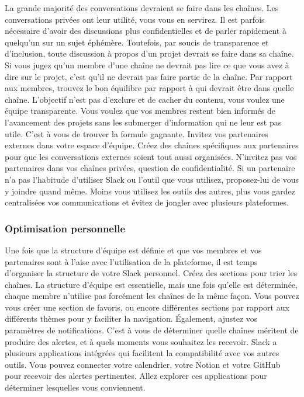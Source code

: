 \documentclass[
  letterpaper,
  DIV=11,
  numbers=noendperiod]{scrreprt}
\begin{document}
La grande majorité des conversations devraient se faire dans les
chaînes. Les conversations privées ont leur utilité, vous vous en
servirez. Il est parfois nécessaire d'avoir des discussions plus
confidentielles et de parler rapidement à quelqu'un sur un sujet
éphémère. Toutefois, par soucis de transparence et d'inclusion, toute
discussion à propos d'un projet devrait se faire dans sa chaîne. Si vous
jugez qu'un membre d'une chaîne ne devrait pas lire ce que vous avez à
dire sur le projet, c'est qu'il ne devrait pas faire partie de la
chaîne. Par rapport aux membres, trouvez le bon équilibre par rapport à
qui devrait être dans quelle chaîne. L'objectif n'est pas d'exclure et
de cacher du contenu, vous voulez une équipe transparente. Vous voulez
que vos membres restent bien informés de l'avancement des projets sans
les submerger d'information qui ne leur est pas utile. C'est à vous de
trouver la formule gagnante. Invitez vos partenaires externes dans votre
espace d'équipe. Créez des chaînes spécifiques aux partenaires pour que
les conversations externes soient tout aussi organisées. N'invitez pas
vos partenaires dans vos chaînes privées, question de confidentialité.
Si un partenaire n'a pas l'habitude d'utiliser Slack ou l'outil que vous
utilisez, proposez-lui de vous y joindre quand même. Moins vous utilisez
les outils des autres, plus vous gardez centralisées vos communications
et évitez de jongler avec plusieurs plateformes.

\subsubsection{Optimisation personnelle}\label{optimisation-personnelle}

Une fois que la structure d'équipe est définie et que vos membres et vos
partenaires sont à l'aise avec l'utilisation de la plateforme, il est
temps d'organiser la structure de votre Slack personnel. Créez des
sections pour trier les chaînes. La structure d'équipe est essentielle,
mais une fois qu'elle est déterminée, chaque membre n'utilise pas
forcément les chaînes de la même façon. Vous pouvez vous créer une
section de favoris, ou encore différentes sections par rapport aux
différents thèmes pour y faciliter la navigation. Également, ajustez vos
paramètres de notifications. C'est à vous de déterminer quelle chaînes
méritent de produire des alertes, et à quels moments vous souhaitez les
recevoir. Slack a plusieurs applications intégrées qui facilitent la
compatibilité avec vos autres outils. Vous pouvez connecter votre
calendrier, votre Notion et votre GitHub pour recevoir des alertes
pertinentes. Allez explorer ces applications pour déterminer lesquelles
vous conviennent.
\end{document}
